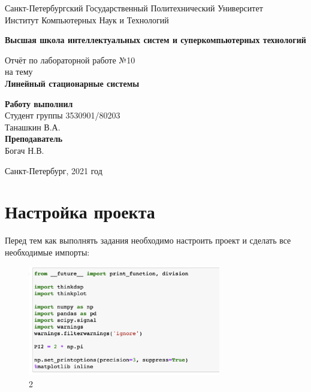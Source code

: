 \documentclass[10pt,a4paper,oneside]{article}
\begin{document}
\begin{titlepage}
\newpage
	\begin{center}
		\Large Санкт-Петербургский Государственный Политехнический Университет\\
		Институт Компьютерных Наук и Технологий\\
	\end{center}
	\begin{center}
		\large\textbf {Высшая школа интеллектуальных систем и суперкомпьютерных технологий}
	\end{center}
	
	\vspace{5em}
	\begin{center}
		\large{Отчёт по лабораторной работе №10 \\ на тему \\
		\textbf{Линейный стационарные системы} }
	\end{center}
	
	\vspace{25em}
	\begin{flushright}
		\textbf{Работу выполнил\\}Студент группы 3530901/80203 \\ Танашкин В.А.\\
		\textbf{Преподаватель\\}Богач Н.В. 
	\end{flushright}
	
	\vspace{\fill}%
	\begin{center}
	Санкт-Петербург, 2021 год	
	\end{center}
\end{titlepage} %

\section{Настройка проекта}
Перед тем как выполнять задания необходимо настроить проект и сделать все необходимые импорты:

\begin{figure}[H]
        \centering
        \includegraphics[width=0.75\textwidth]{pics/0.png}
        \caption{2}
        \label{fig:first}
\end{figure}
\end{document}
